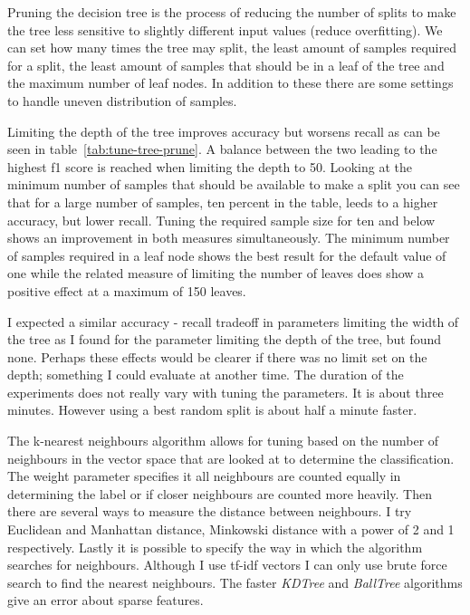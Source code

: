 \documentclass[11pt]{article}
\begin{document}
Pruning the decision tree is the process of reducing the number of splits to make the tree less sensitive to slightly different input values (reduce overfitting). We can set how many times the tree may split, the least amount of samples required for a split, the least amount of samples that should be in a leaf of the tree and the maximum number of leaf nodes. In addition to these there are some settings to handle uneven distribution of samples.

Limiting the depth of the tree improves accuracy but worsens recall as can be seen in table~\ref{tab:tune-tree-prune}. A balance between the two leading to the highest f1 score is reached when limiting the depth to 50. Looking at the minimum number of samples that should be available to make a split you can see that for a large number of samples, ten percent in the table, leeds to a higher accuracy, but lower recall. Tuning the required sample size for ten and below shows an improvement in both measures simultaneously. The minimum number of samples required in a leaf node shows the best result for the default value of one while the related measure of limiting the number of leaves does show a positive effect at a maximum of 150 leaves.

I expected a similar accuracy - recall tradeoff in parameters limiting the width of the tree as I found for the parameter limiting the depth of the tree, but found none. Perhaps these effects would be clearer if there was no limit set on the depth; something I could evaluate at another time. The duration of the experiments does not really vary with tuning the parameters. It is about three minutes. However using a best random split is about half a minute faster.

The k-nearest neighbours algorithm allows for tuning based on the number of neighbours in the vector space that are looked at to determine the classification. The weight parameter specifies it all neighbours are counted equally in determining the label or if closer neighbours are counted more heavily. Then there are several ways to measure the distance between neighbours. I try Euclidean and Manhattan distance, Minkowski distance with a power of 2 and 1 respectively. Lastly it is possible to specify the way in which the algorithm searches for neighbours. Although I use tf-idf vectors I can only use brute force search to find the nearest neighbours. The faster \emph{KDTree} and \emph{BallTree} algorithms give an error about sparse features.
\end{document}
